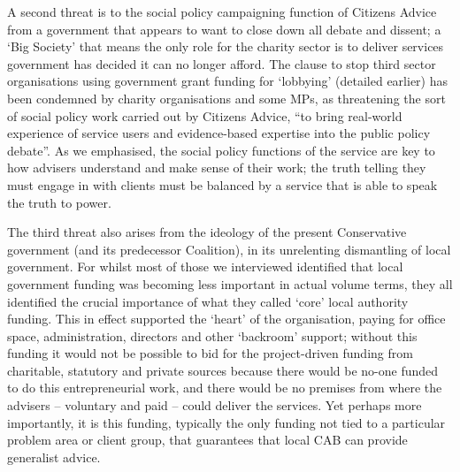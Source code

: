 \par
A second threat is to the social policy campaigning function of Citizens Advice from a government that appears to want to close down all debate and dissent; a ‘Big Society’ that means the only role for the charity sector is to deliver services government has decided it can no longer afford. The clause to stop third sector organisations using government grant funding for ‘lobbying’ (detailed earlier) has been condemned by charity organisations and some MPs, as threatening the sort of social policy work carried out by Citizens Advice, “to bring real-world experience of service users and evidence-based expertise into the public policy debate”.%
As we emphasised, the social policy functions of the service are key to how advisers understand and make sense of their work; the truth telling they must engage in with clients must be balanced by a service that is able to speak the truth to power.
\par
The third threat also arises from the ideology of the present Conservative government (and its predecessor Coalition), in its unrelenting dismantling of local government.%
For whilst most of those we interviewed identified that local government funding was becoming less important in actual volume terms, they all identified the crucial importance of what they called ‘core’ local authority funding. This in effect supported the ‘heart’ of the organisation, paying for office space, administration, directors and other ‘backroom’ support; without this funding it would not be possible to bid for the project-driven funding from charitable, statutory and private sources because there would be no-one funded to do this entrepreneurial work, and there would be no premises from where the advisers – voluntary and paid – could deliver the services. Yet perhaps more importantly, it is this funding, typically the only funding not tied to a particular problem area or client group, that guarantees that local CAB can provide generalist advice. 
\par
